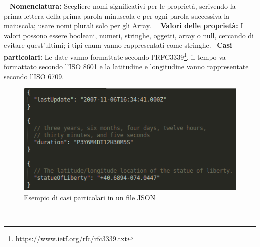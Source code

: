 	~\newline
	\textbf{Nomenclatura:} Scegliere nomi significativi per le proprietà, scrivendo la prima lettera della prima parola minuscola e per ogni parola successiva la maiuscola; usare nomi plurali solo per gli Array.~\newline ~\newline
	\textbf{Valori delle proprietà:} I valori possono essere booleani, numeri, stringhe, oggetti, array o null, cercando di evitare quest'ultimi; i tipi enum vanno rappresentati come stringhe.~\newline
	\textbf{Casi particolari:} Le date vanno formattate secondo l'RFC3339\footnote{\url{https://www.ietf.org/rfc/rfc3339.txt}}, il tempo va formattato secondo l'ISO 8601 e la latitudine e longitudine vanno rappresentate secondo l'ISO 6709.~\newline
	\begin{figure}[!htbp]
		\centering
		\includegraphics{casiParticolariJson.png}
		\caption{Esempio di casi particolari in un file JSON}
		\label{json2}
	\end{figure}
	~\newline
	
